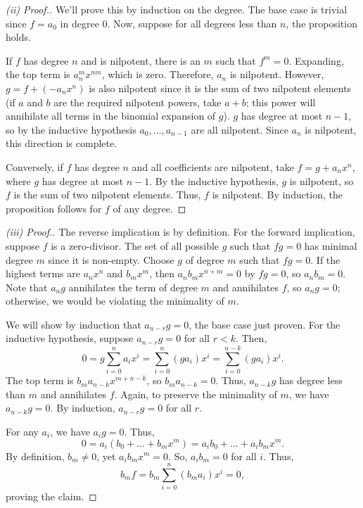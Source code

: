 \begin{proof}[(ii) Proof.]
We'll prove this by induction on the degree. The base case is trivial since $f = a_0$ in degree 0. Now, suppose for all degrees 
less than $n$, the proposition holds.

If $f$ has degree $n$ and is nilpotent, there is an $m$ such that $f^m = 0$. Expanding, the top term is $a_n^m x^{nm}$, which is zero. Therefore,
$a_n$ is nilpotent. However, $g = f + (- a_nx^n)$ is also nilpotent since it is the sum of two nilpotent elements (if $a$ and $b$ are the required nilpotent
powers, take $a + b$; this power will annihilate all terms in the binomial expansion of $g$). $g$ has degree at most $n-1$, so by the inductive hypothesis
$a_0,\ldots,a_{n-1}$ are all nilpotent. Since $a_n$ is nilpotent, this direction is complete.

Conversely, if $f$ has degree $n$ and all coefficients are nilpotent, take $f = g + a_n x^n$, where $g$ has degree at most $n-1$. By the inductive hypothesis,
$g$ is nilpotent, so $f$ is the sum of two nilpotent elements. Thus, $f$ is nilpotent. By induction, the proposition follows for $f$ of any degree.
\end{proof}

\begin{proof}[(iii) Proof.]
The reverse implication is by definition. For the forward implication, suppose $f$ is a zero-divisor. The set of all possible $g$ such that
$fg = 0$ has minimal degree $m$ since it is non-empty. Choose $g$ of degree $m$ such that $fg = 0$. If the highest terms are $a_n x^n$ and $b_m x^m$, 
then $a_nb_mx^{n+m} = 0$ by $fg = 0$, so $a_n b_m = 0$. Note that $a_n g$ annihilates the term of degree $m$ and annihilates $f$, so $a_n g = 0$; 
otherwise, we would be violating the minimality of $m$. 

We will show by induction that $a_{n-r}g = 0$, the base case just proven. For the inductive hypothesis, suppose $a_{n-r}g=0$ for all $r < k$. Then,
$$0 = g\sum_{i=0}^na_ix^i = \sum_{i=0}^n(ga_i)x^i = \sum_{i=0}^{n-k}(ga_i)x^i.$$
The top term is $b_m a_{n-k} x^{m+n-k}$, so $b_m a_{n-k} = 0$. Thus, $a_{n-k}g$ has degree less than $m$ and annihilates $f$. 
Again, to preserve the minimality of $m$, we have $a_{n-k} g = 0$. By induction, $a_{n-r}g = 0$ for all $r$.

For any $a_i$, we have $a_ig = 0$. Thus,
$$0 = a_i\left(b_0 + \dots + b_m x^m\right) = a_ib_0 + \dots + a_ib_m x^m.$$
By definition, $b_m \neq 0$, yet $a_ib_m x^m = 0$. So, $a_i b_m = 0$ for all $i$. Thus,
$$b_m f = b_m \sum_{i=0}^n (b_m a_i) x^i = 0,$$
proving the claim.
\end{proof}

